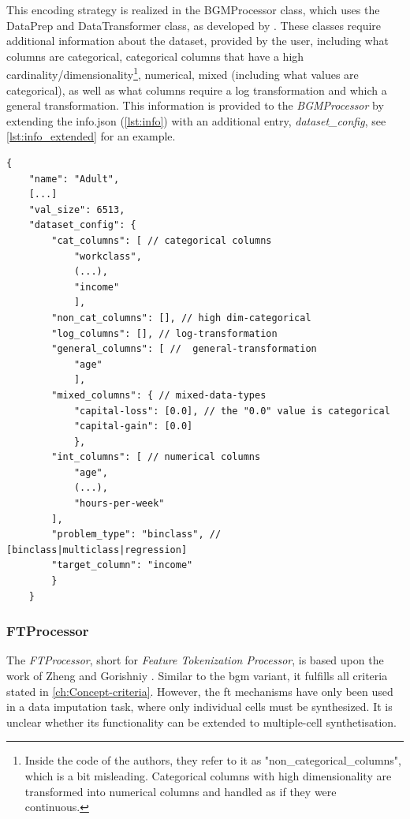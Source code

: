This encoding strategy is realized in the BGMProcessor class, which uses the DataPrep and DataTransformer class, as developed by \cite{zhao2022CTABGANEnhancingTabular}.
These classes require additional information about the dataset, provided by the user, including what columns are categorical, categorical columns that have a high cardinality/dimensionality\footnote{Inside the code of the authors, they refer to it as "non\_categorical\_columns", which is a bit misleading. Categorical columns with high dimensionality are transformed into numerical columns and handled as if they were continuous.},
numerical, mixed (including what values are categorical), as well as what columns require a log transformation and which a general transformation.
This information is provided to the \textit{BGMProcessor} by extending the info.json (\autoref{lst:info}) with an additional entry, \textit{dataset\_config}, see \autoref{lst:info_extended} for an example.

\begin{lstlisting}[label={lst:info_extended},caption={Example extended data info file from the adult dataset (\autoref{ch:methods-datasets})}]
    {
    "name": "Adult",
    [...]
    "val_size": 6513,
    "dataset_config": {
        "cat_columns": [ // categorical columns
            "workclass", 
            (...), 
            "income"
            ],
        "non_cat_columns": [], // high dim-categorical
        "log_columns": [], // log-transformation
        "general_columns": [ //  general-transformation
            "age"
            ], 
        "mixed_columns": { // mixed-data-types
            "capital-loss": [0.0], // the "0.0" value is categorical           
            "capital-gain": [0.0]
            },
        "int_columns": [ // numerical columns 
            "age", 
            (...), 
            "hours-per-week"
        ],
        "problem_type": "binclass", // [binclass|multiclass|regression]
        "target_column": "income"
        }
    }
\end{lstlisting}

\subsubsection{FTProcessor}
\label{ch:FTProcessor}

The \textit{FTProcessor}, short for \textit{Feature Tokenization Processor}, is based upon the work of Zheng \etal \cite{zheng2022DiffusionModelsMissing} and Gorishniy \etal \cite{gorishniy2021RevisitingDeepLearning}.
Similar to the \gls{bgm} variant, it fulfills all criteria stated in \autoref{ch:Concept-criteria}.
However, the \gls{ft} mechanisms have only been used in a data imputation task, where only individual cells must be synthesized.
It is unclear whether its functionality can be extended to multiple-cell synthetisation.

